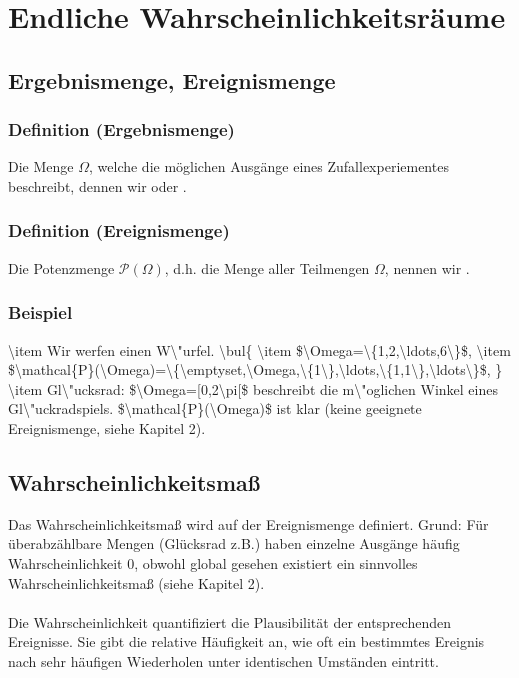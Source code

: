 \section{Endliche Wahrscheinlichkeitsr\"aume}
\subsection{Ergebnismenge, Ereignismenge}
\subsubsection{Definition (Ergebnismenge)}
Die Menge $\Omega$, welche die m\"oglichen Ausg\"ange eines Zufallexperiementes beschreibt, dennen wir  oder .
\subsubsection{Definition (Ereignismenge)}
Die Potenzmenge $\mathcal{P}(\Omega)$, d.h. die Menge aller Teilmengen $\Omega$, nennen wir .
\subsubsection{Beispiel}
\num{
\item Wir werfen einen W\"urfel.
\bul{
\item $\Omega=\{1,2,\ldots,6\}$,
\item $\mathcal{P}(\Omega)=\{\emptyset,\Omega,\{1\},\ldots,\{1,1\},\ldots\}$,
}
\item Gl\"ucksrad: $\Omega=[0,2\pi[$ beschreibt die m\"oglichen Winkel eines Gl\"uckradspiels. $\mathcal{P}(\Omega)$ ist klar (keine geeignete Ereignismenge, siehe Kapitel 2).
}
\subsection{Wahrscheinlichkeitsma\ss{}}
Das Wahrscheinlichkeitsma\ss{} wird auf der Ereignismenge definiert. Grund: F\"ur \"uberabz\"ahlbare Mengen (Gl\"ucksrad z.B.) haben einzelne Ausg\"ange h\"aufig Wahrscheinlichkeit $0$, obwohl global gesehen existiert ein sinnvolles Wahrscheinlichkeitsma\ss{} (siehe Kapitel 2).
\\~\\
Die Wahrscheinlichkeit quantifiziert die Plausibilit\"at der entsprechenden Ereignisse. Sie gibt die relative H\"aufigkeit an, wie oft ein bestimmtes Ereignis nach sehr h\"aufigen Wiederholen unter identischen Umst\"anden eintritt.
